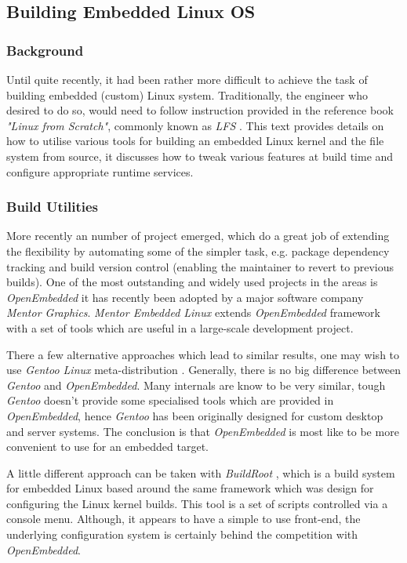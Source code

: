 \subsection{Building Embedded Linux OS}

\subsubsection{Background}

  Until quite recently, it had been rather more difficult to achieve
 the task of building embedded (custom) Linux system. Traditionally,
 the engineer who desired to do so, would need to follow instruction
 provided in the reference book \emph{"Linux from Scratch"}, commonly
 known as \emph{LFS} \cite{book:lfs}. This text provides details on
 how to utilise various tools for building an embedded Linux kernel
 and the file system from source, it discusses how to tweak various
 features at build time and configure appropriate runtime services.

\subsubsection{Build Utilities}
 
  More recently an number of project emerged, which do a
 great job of extending the flexibility by automating some of the
 simpler task, e.g. package dependency tracking and build version
 control (enabling the maintainer to revert to previous builds).
 One of the most outstanding and widely used projects in the areas
 is \emph{OpenEmbedded} \cite{links:oe} it has recently been adopted
 by a major software company \emph{Mentor Graphics}. \emph{Mentor
 Embedded Linux} extends \emph{OpenEmbedded} framework with a set
 of tools which are useful in a large-scale development project.
 
  There a few alternative approaches which lead to similar results,
 one may wish to use \emph{Gentoo Linux} meta-distribution
 \cite{links:gentoo:embedded}.
 Generally, there is no big difference between \emph{Gentoo} and
 \emph{OpenEmbedded}. Many internals are know to be very similar,
 tough \emph{Gentoo} doesn't provide some specialised tools which 
 are provided in \emph{OpenEmbedded}, hence \emph{Gentoo} has been
 originally designed for custom desktop and server systems.
 The conclusion is that \emph{OpenEmbedded} is most like to be
 more convenient to use for an embedded target.
 
  A little different approach can be taken with \emph{BuildRoot}
 \cite{links:buildroot:homepage}, which is a build system for
 embedded Linux based around the same framework which was design
 for configuring the Linux kernel builds. This tool is a set of
 scripts controlled via a console menu. Although, it appears to
 have a simple to use front-end, the underlying configuration
 system is certainly behind the competition with \emph{OpenEmbedded}.

